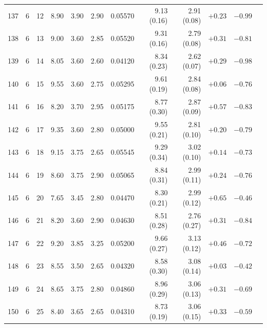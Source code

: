 \begin{longtable}{@{}rrrrrrrrrrrr@{}}
137 & 6 & 12 & \num{8.90} & \num{3.90} & \num{2.90} & \num{0.05570} & \num{9.13} (\num{0.16}) & \num{2.91} (\num{0.08}) & $+\num{0.23}$ & $-\num{0.99}$ &  \\
138 & 6 & 13 & \num{9.00} & \num{3.60} & \num{2.85} & \num{0.05520} & \num{9.31} (\num{0.16}) & \num{2.79} (\num{0.08}) & $+\num{0.31}$ & $-\num{0.81}$ &  \\
139 & 6 & 14 & \num{8.05} & \num{3.60} & \num{2.60} & \num{0.04120} & \num{8.34} (\num{0.23}) & \num{2.62} (\num{0.07}) & $+\num{0.29}$ & $-\num{0.98}$ &  \\
140 & 6 & 15 & \num{9.55} & \num{3.60} & \num{2.75} & \num{0.05295} & \num{9.61} (\num{0.19}) & \num{2.84} (\num{0.08}) & $+\num{0.06}$ & $-\num{0.76}$ &  \\
141 & 6 & 16 & \num{8.20} & \num{3.70} & \num{2.95} & \num{0.05175} & \num{8.77} (\num{0.30}) & \num{2.87} (\num{0.09}) & $+\num{0.57}$ & $-\num{0.83}$ &  \\
142 & 6 & 17 & \num{9.35} & \num{3.60} & \num{2.80} & \num{0.05000} & \num{9.55} (\num{0.21}) & \num{2.81} (\num{0.10}) & $+\num{0.20}$ & $-\num{0.79}$ &  \\
143 & 6 & 18 & \num{9.15} & \num{3.75} & \num{2.65} & \num{0.05545} & \num{9.29} (\num{0.34}) & \num{3.02} (\num{0.10}) & $+\num{0.14}$ & $-\num{0.73}$ &  \\
144 & 6 & 19 & \num{8.60} & \num{3.75} & \num{2.90} & \num{0.05065} & \num{8.84} (\num{0.31}) & \num{2.99} (\num{0.11}) & $+\num{0.24}$ & $-\num{0.76}$ &  \\
145 & 6 & 20 & \num{7.65} & \num{3.45} & \num{2.80} & \num{0.04470} & \num{8.30} (\num{0.21}) & \num{2.99} (\num{0.12}) & $+\num{0.65}$ & $-\num{0.46}$ &  \\
146 & 6 & 21 & \num{8.20} & \num{3.60} & \num{2.90} & \num{0.04630} & \num{8.51} (\num{0.28}) & \num{2.76} (\num{0.27}) & $+\num{0.31}$ & $-\num{0.84}$ &  \\
147 & 6 & 22 & \num{9.20} & \num{3.85} & \num{3.25} & \num{0.05200} & \num{9.66} (\num{0.27}) & \num{3.13} (\num{0.12}) & $+\num{0.46}$ & $-\num{0.72}$ &  \\
148 & 6 & 23 & \num{8.55} & \num{3.50} & \num{2.65} & \num{0.04320} & \num{8.58} (\num{0.30}) & \num{3.08} (\num{0.14}) & $+\num{0.03}$ & $-\num{0.42}$ &  \\
149 & 6 & 24 & \num{8.65} & \num{3.75} & \num{2.80} & \num{0.04860} & \num{8.96} (\num{0.29}) & \num{3.06} (\num{0.13}) & $+\num{0.31}$ & $-\num{0.69}$ &  \\
150 & 6 & 25 & \num{8.40} & \num{3.65} & \num{2.65} & \num{0.04310} & \num{8.73} (\num{0.19}) & \num{3.06} (\num{0.15}) & $+\num{0.33}$ & $-\num{0.59}$ &  \\

\end{longtable}
